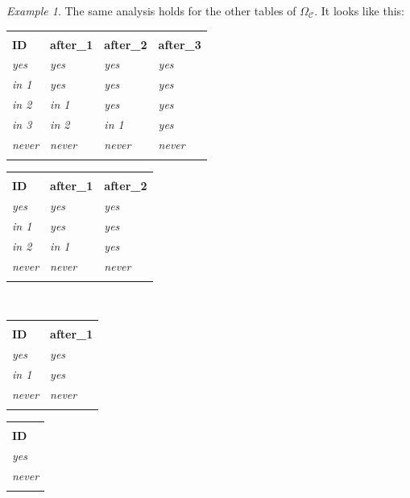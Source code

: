 \documentclass{book}
\def\mc{\mathcal}
\def\hsp{\hspace{.3in}}
\def\bhline{\Xhline{2\arrayrulewidth}}
\def\bbhline{\Xhline{2.5\arrayrulewidth}}
\def\mcC{\mc{C}}
\theoremstyle{remark}
\newtheorem{example}[subsubsection]{Example}
\theoremstyle{definition}
\begin{document}
\begin{example}
The same analysis holds for the other tables of $\Omega_\mcC$. It looks like this:
\begin{center}
\begin{tabular}{| l || l | l | l |}
\bhline
\multicolumn{4}{|c|}{$\Omega_\mcC({\tt 0})$}\\\bhline
{\bf ID}&{\bf after\_1}&{\bf after\_2}&{\bf after\_3}\\\bbhline
{\it yes}&{\it yes}&{\it yes}&{\it yes}\\\hline
{\it in 1}&{\it yes}&{\it yes}&{\it yes}\\\hline
{\it in 2}&{\it in 1}&{\it yes}&{\it yes}\\\hline
{\it in 3}&{\it in 2}&{\it in 1}&{\it yes}\\\hline
{\it never}&{\it never}&{\it never}&{\it never}\\\bhline
\end{tabular}
\hsp
\begin{tabular}{| l || l | l |}
\bhline
\multicolumn{3}{|c|}{$\Omega_\mcC({\tt 1})$}\\\bhline
{\bf ID}&{\bf after\_1}&{\bf after\_2}\\\bbhline
{\it yes}&{\it yes}&{\it yes}\\\hline
{\it in 1}&{\it yes}&{\it yes}\\\hline
{\it in 2}&{\it in 1}&{\it yes}\\\hline
{\it never}&{\it never}&{\it never}\\\bhline
\end{tabular}\\\vspace{.2in}
\begin{tabular}{| l || l |}
\bhline
\multicolumn{2}{|c|}{$\Omega_\mcC({\tt 2})$}\\\bhline
{\bf ID}&{\bf after\_1}\\\bbhline
{\it yes}&{\it yes}\\\hline
{\it in 1}&{\it yes}\\\hline
{\it never}&{\it never}\\\bhline
\end{tabular}
\hsp
\begin{tabular}{| l ||}
\bhline
\multicolumn{1}{|c|}{$\Omega_\mcC({\tt 3})$}\\\bhline
{\bf ID}\\\bbhline
{\it yes}\\\hline
{\it never}\\\bhline
\end{tabular}


\end{center}
\end{example}
\end{document}

